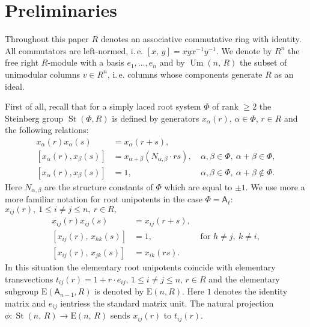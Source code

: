 \documentclass[11pt]{amsart}
\theoremstyle{plain} \declaretheorem[name=Theorem, Refname={Theorem,Theorems}]{tm} \Crefname{tm}{Theorem}{Theorems}
\numberwithin{equation}{section}
\theoremstyle{definition} \newtheorem{df}[lm]{Definition} \Crefname{df}{Definition}{Definitions}
\theoremstyle{remark} \newtheorem{rk}[lm]{Remark} \Crefname{rk}{Remark}{Remarks}
\newcommand{\E}{{\mathrm{E}}}
\newcommand{\Um}{\mathop{\mathrm{Um}}\nolimits}
\newcommand{\St}{\mathop{\mathrm{St}}\nolimits}
\newcommand{\inv}{^{-1}}
\newcommand{\rA}{\mathsf{A}}
\begin{document}
\section{Preliminaries} \label{sec:prelim}
Throughout this paper $R$ denotes an associative commutative ring with identity.
All commutators are left-normed, i.\,e. $[x,\,y]=xyx\inv y\inv$. 
We denote by $R^n$ the free right $R$-module with a basis $e_1,\ldots,e_n$ and by $\Um(n,\,R)$ the subset of unimodular columns $v\in R^n$, i.\,e. 
columns whose components generate $R$ as an ideal.

First of all, recall that for a simply laced root system $\Phi$ of rank $\geq 2$ the Steinberg group $\St(\Phi, R)$ 
is defined by generators $x_\alpha(r)$, $\alpha\in\Phi$, $r\in R$ and the following relations:
\begin{align}
 x_\alpha(r) x_\alpha(s) & = x_\alpha(r+s), & \nonumber \\
 [x_\alpha(r),  x_\beta(s)] & = x_{\alpha+\beta}(N_{\alpha,\beta}\cdot rs), &\ \alpha,\beta\in \Phi,\ \alpha+\beta\in\Phi, \nonumber \\
 [x_\alpha(r),  x_\beta(s)] & = 1, &\ \alpha,\beta\in \Phi,\ \alpha+\beta\not\in\Phi. \nonumber
\end{align}
Here $N_{\alpha,\beta}$ are the structure constants of $\Phi$ which are equal to $\pm 1$.
We use more a more familiar notation for root unipotents in the case $\Phi=\rA_\ell$:
$x_{ij}(r),\ 1\leq i\neq j\leq n,\ r\in R,$
\setcounter{equation}{0}
\renewcommand{\theequation}{S\arabic{equation}}
\begin{align}
x_{ij}(r)x_{ij}(s)      & = x_{ij}(r+s),& \label{add0}\\
[x_{ij}(r),\,x_{hk}(s)] & = 1,& \text{ for }h\neq j,\ k\neq i, \label{ccf1}\\
[x_{ij}(r),\,x_{jk}(s)] & = x_{ik}(rs).& \label{ccf2}
\end{align}
In this situation the elementary root unipotents coincide with elementary transvections $t_{ij}(r)=1+r \cdot e_{ij}$, $1\leq i\neq j\leq n$, $r\in R$
and the elementary subgroup $\E(\rA_{n-1}, R)$ is denoted by $\E(n, R)$.
Here $1$ denotes the identity matrix and $e_{ij}$ ientriess the standard matrix unit. 
The natural projection $\phi\colon\St(n,\,R)\rightarrow\E(n,\,R)$ sends $x_{ij}(r)$ to $t_{ij}(r)$.
\end{document}
